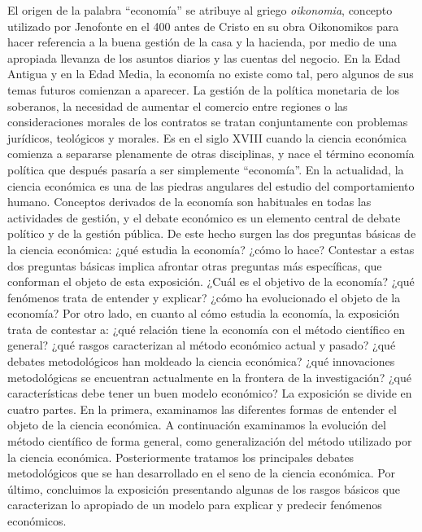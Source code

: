 \documentclass{nuevotema}
\begin{document}
\ideaclave

El origen de la palabra ``economía'' se atribuye al griego \textit{oikonomia}, concepto utilizado por Jenofonte en el 400 antes de Cristo en su obra Oikonomikos para hacer referencia a la buena gestión de la casa y la hacienda, por medio de una apropiada llevanza de los asuntos diarios y las cuentas del negocio. En la Edad Antigua y en la Edad Media, la economía no existe como tal, pero algunos de sus temas futuros comienzan a aparecer. La gestión de la política monetaria de los soberanos, la necesidad de aumentar el comercio entre regiones o las consideraciones morales de los contratos se tratan conjuntamente con problemas jurídicos, teológicos y morales. Es en el siglo XVIII cuando la ciencia económica comienza a separarse plenamente de otras disciplinas, y nace el término economía política que después pasaría a ser simplemente ``economía''. En la actualidad, la ciencia económica es una de las piedras angulares del estudio del comportamiento humano. Conceptos derivados de la economía son habituales en todas las actividades de gestión, y el debate económico es un elemento central de debate político y de la gestión pública. De este hecho surgen las dos preguntas básicas de la ciencia económica: ¿qué estudia la economía? ¿cómo lo hace? Contestar a estas dos preguntas básicas implica afrontar otras preguntas más específicas, que conforman el objeto de esta exposición. ¿Cuál es el objetivo de la economía? ¿qué fenómenos trata de entender y explicar? ¿cómo ha evolucionado el objeto de la economía? Por otro lado, en cuanto al cómo estudia la economía, la exposición trata de contestar a: ¿qué relación tiene la economía con el método científico en general? ¿qué rasgos caracterizan al método económico actual y pasado? ¿qué debates metodológicos han moldeado la ciencia económica? ¿qué innovaciones metodológicas se encuentran actualmente en la frontera de la investigación? ¿qué características debe tener un buen modelo económico? La exposición se divide en cuatro partes. En la primera, examinamos las diferentes formas de entender el objeto de la ciencia económica. A continuación examinamos la evolución del método científico de forma general, como generalización del método utilizado por la ciencia económica. Posteriormente tratamos los principales debates metodológicos que se han desarrollado en el seno de la ciencia económica. Por último, concluimos la exposición presentando algunas de los rasgos básicos que caracterizan lo apropiado de un modelo para explicar y predecir fenómenos económicos.
\end{document}
